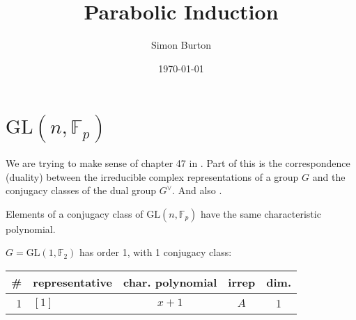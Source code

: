 \documentclass[11pt,oneside]{article}
\title{Parabolic Induction}
\author{Simon Burton}
\date{\today}
\newcommand{\GL}{\mathrm{GL}}
\newcommand{\Field}{\mathbb{F}}
\begin{document}
\maketitle

\section{$\GL(n,\Field_p)$}

We are trying to make sense of chapter 47 in \cite{Bump2004}.
Part of this is the correspondence (duality)
between the irreducible complex
representations of a group $G$ and the conjugacy classes of the dual group $G^{\vee}$.
And also \cite{Joyal1995}.

Elements of a 
conjugacy class of $\GL(n,\Field_p)$ have the same characteristic polynomial.



\setlength{\tabcolsep}{10pt}
\setlength{\arraycolsep}{1pt}
\renewcommand{\arraystretch}{0.5}


$G=\GL(1,\Field_2)$ has order 1, with 1 conjugacy class:
\begin{center}
\begin{tabular}{r|l|c|c|c}
\# & representative & char. polynomial & irrep & dim. \\
\hline
1 & $[1]$           & $x+1$            & $A$   & 1    \\
\end{tabular}
\end{center}
\end{document}
